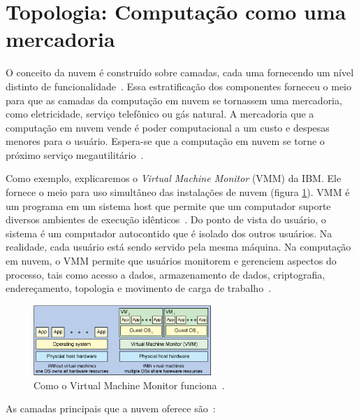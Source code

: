 \section{Topologia: Computação como uma mercadoria}

O conceito da nuvem é construído sobre camadas, cada uma fornecendo um nível 
distinto de funcionalidade~\cite{cloud-computing-fundamentals}. Essa estratificação 
dos componentes forneceu o meio para que as camadas da computação em nuvem se 
tornassem uma mercadoria, como eletricidade, serviço telefônico ou gás natural. A 
mercadoria que a computação em nuvem vende é poder computacional a um custo e 
despesas menores para o usuário. Espera-se que a computação em nuvem se torne o 
próximo serviço megautilitário~\cite{cloud-computing-fundamentals}.

Como exemplo, explicaremos o \emph{Virtual Machine Monitor} (VMM) da IBM. Ele 
fornece o meio para uso simultâneo das instalações de nuvem (figura \ref{fig:vmm}). 
VMM é um programa em um sistema host que permite que um computador suporte diversos 
ambientes de execução idênticos~\cite{cloud-computing-fundamentals}. Do ponto de 
vista do usuário, o sistema é um computador autocontido que é isolado dos outros 
usuários. Na realidade, cada usuário está sendo servido pela mesma máquina. Na 
computação em nuvem, o VMM permite que usuários monitorem e gerenciem aspectos do 
processo, tais como acesso a dados, armazenamento de dados, criptografia, 
endereçamento, topologia e movimento de carga de 
trabalho~\cite{cloud-computing-fundamentals}. 


\begin{figure}[ht]
    \centering
    \includegraphics[width=0.6\textwidth]{img/vmm.png}
    \caption{Como o Virtual Machine Monitor
        funciona~\cite{cloud-computing-fundamentals}.
    } 
    \label{fig:vmm}
\end{figure}


As camadas principais que a nuvem oferece são~\cite{cloud-computing-fundamentals}:

\newcommand{\itemm}[1]{\item\textbf{#1}}

